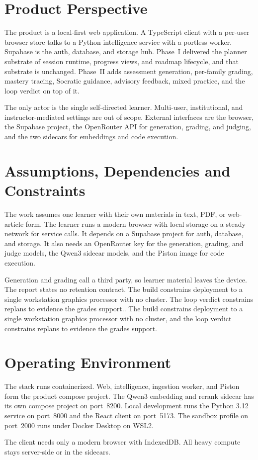 \section{Product Perspective}
The product is a local-first web application. A TypeScript client with a per-user browser store talks to a Python intelligence service with a portless worker. Supabase is the auth, database, and storage hub. Phase~I delivered the planner substrate of session runtime, progress views, and roadmap lifecycle, and that substrate is unchanged. Phase~II adds assessment generation, per-family grading, mastery tracing, Socratic guidance, advisory feedback, mixed practice, and the loop verdict on top of it.

The only actor is the single self-directed learner. Multi-user, institutional, and instructor-mediated settings are out of scope. External interfaces are the browser, the Supabase project, the OpenRouter API for generation, grading, and judging, and the two sidecars for embeddings and code execution.

\section{Assumptions, Dependencies and Constraints}
The work assumes one learner with their own materials in text, PDF, or web-article form. The learner runs a modern browser with local storage on a steady network for service calls. It depends on a Supabase project for auth, database, and storage. It also needs an OpenRouter key for the generation, grading, and judge models, the Qwen3 sidecar models, and the Piston image for code execution.

Generation and grading call a third party, so learner material leaves the device. The report states no retention contract. The build constrains deployment to a single workstation graphics processor with no cluster. The loop verdict constrains replans to evidence the grades support.. The build constrains deployment to a single workstation graphics processor with no cluster, and the loop verdict constrains replans to evidence the grades support.

\section{Operating Environment}
The stack runs containerized. Web, intelligence, ingestion worker, and Piston form the product compose project. The Qwen3 embedding and rerank sidecar has its own compose project on port~8200. Local development runs the Python 3.12 service on port~8000 and the React client on port~5173. The sandbox profile on port~2000 runs under Docker Desktop on WSL2.

The client needs only a modern browser with IndexedDB. All heavy compute stays server-side or in the sidecars.
